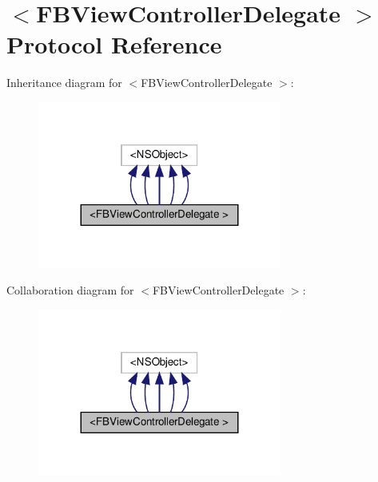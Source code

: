 \hypertarget{protocolFBViewControllerDelegate_01-p}{}\section{$<$F\+B\+View\+Controller\+Delegate $>$ Protocol Reference}
\label{protocolFBViewControllerDelegate_01-p}


Inheritance diagram for $<$F\+B\+View\+Controller\+Delegate $>$\+:
\nopagebreak
\begin{figure}[H]
\begin{center}
\leavevmode
\includegraphics[width=227pt]{protocolFBViewControllerDelegate_01-p__inherit__graph}
\end{center}
\end{figure}


Collaboration diagram for $<$F\+B\+View\+Controller\+Delegate $>$\+:
\nopagebreak
\begin{figure}[H]
\begin{center}
\leavevmode
\includegraphics[width=227pt]{protocolFBViewControllerDelegate_01-p__coll__graph}
\end{center}
\end{figure}
